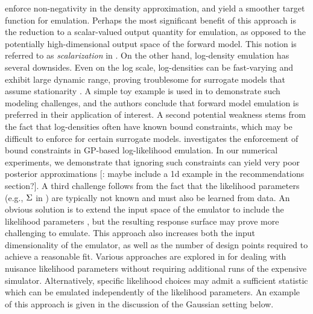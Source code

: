 \documentclass[12pt]{article}
\begin{document}
enforce non-negativity in the density approximation, and yield a smoother target function for emulation.
Perhaps the most significant benefit of this approach is the reduction to a scalar-valued output quantity for emulation,
as opposed to the potentially high-dimensional output space of the forward model. This notion is referred 
to as \textit{scalarization} in \citet{ranjan2016inverse, trainDynamics}.
On the other hand, log-density emulation has several downsides. Even on the log scale, log-densities can be fast-varying and 
exhibit large dynamic range, proving troublesome for surrogate models that assume stationarity \cite{wang2018adaptive}.
A simple toy example is used in \citep{Surer2023sequential} to demonstrate such modeling challenges, and the 
authors conclude that forward model emulation is preferred in their application of interest. A second potential weakness 
stems from the fact that log-densities often have known bound constraints, which may be difficult to enforce 
for certain surrogate models. \citet{quantileApprox} investigates the enforcement of 
bound constraints in GP-based log-likelihood emulation. In our numerical experiments, we demonstrate that ignoring
such constraints can yield very poor posterior approximations [\todo: maybe include a 1d example in the
recommendations section?]. A third challenge follows from the fact that 
the likelihood parameters (e.g., $\Sigma$ in ) are typically not known and must also be 
learned from data. An obvious solution is to extend the input space of the emulator to include the likelihood parameters
\citep{llikRBF,emPostDens}, but the resulting response surface may prove more challenging to emulate. 
This approach also increases both the input dimensionality of the emulator, as well as the number of design points required to achieve 
a reasonable fit. Various approaches are explored in \citet{llikRBF} for dealing with nuisance likelihood parameters
without requiring additional runs of the expensive simulator. Alternatively, specific likelihood 
choices may admit a sufficient statistic which can be emulated independently of the likelihood parameters. 
An example of this approach is given in the discussion of the Gaussian setting below.
\end{document}
